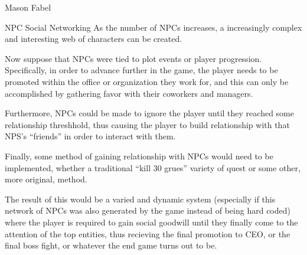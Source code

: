 \documentclass[12pt]{report}
\begin{document}
\begin{section}{Mason Fabel}
\begin{subsection}{NPC Social Networking}
As the number of NPCs increases, a increasingly complex and interesting web
of characters can be created.

Now suppose that NPCs were tied to plot events or player progression.
Specifically, in order to advance further in the game, the player needs
to be promoted within the office or organization they work for, and this
can only be accomplished by gathering favor with their coworkers and
managers.

Furthermore, NPCs could be made to ignore the player until they reached
some relationship threshhold, thus causing the player to build relationship
with that NPS's ``friends'' in order to interact with them.

Finally, some method of gaining relationship with NPCs would need to be
implemented, whether a traditional ``kill 30 grues'' variety of quest or
some other, more original, method.

The result of this would be a varied and dynamic system (especially if this
network of NPCs was also generated by the game instead of being hard coded)
where the player is required to gain social goodwill until they finally
come to the attention of the top entities, thus recieving the final
promotion to CEO, or the final boss fight, or whatever the end game turns
out to be.
\end{subsection}

\end{section}
\end{document}
